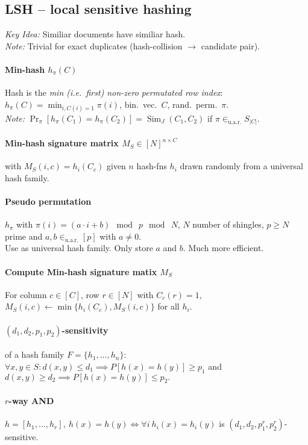\documentclass[9pt]{scrartcl}
\DeclareMathOperator{\Sim}{Sim}
\newcommand{\inuar}{\in_{\text{u.a.r.}}}
\begin{document}
\begin{twocolumn}
\subsection{LSH -- local sensitive hashing}
\emph{Key Idea:} Similiar documents have similiar hash. \\
\emph{Note:} Trivial for exact duplicates (hash-collision $\rightarrow$ candidate pair).
\paragraph{Min-hash $h_\pi(C)$}
Hash is the \emph{min (i.e.\ first) non-zero permutated row index}: $h_\pi(C) = \min_{i, C(i) = 1} \pi(i)$,
bin.\ vec.\ $C$, rand.\ perm.\ $\pi$. \\
\emph{Note:} $\Pr_\pi[h_\pi(C_1) = h_\pi(C_2)] = \Sim_J(C_1,C_2)$ if $\pi \inuar S_{|C|}$.
\paragraph{Min-hash signature matrix $M_S \in [N]^{n\times C}$}
with $M_S(i,c) = h_i(C_c)$
given $n$ hash-fns $h_i$ drawn randomly from a universal hash family.

\paragraph{Pseudo permutation}
$h_\pi$ with $\pi(i) = (a\cdot i + b) \mod\ p \mod\ N$, $N$ number of shingles, $p\geq N$ prime and $a,b \inuar [p]$ with $a \neq 0$. \\
Use as universal hash family. Only store $a$ and $b$. Much more efficient.

\paragraph{Compute Min-hash signature matix $M_S$}
For column $c \in [C]$, row $r \in [N]$ with $C_c(r) = 1$, $M_S(i,c) \leftarrow \min\{h_i(C_c), M_S(i,c)\}$ for all $h_i$.

\paragraph{$(d_1,d_2,p_1,p_2)$-sensitivity} of a hash family $F = \{h_1,\dots,h_n\}$: $\forall x,y \in S: d(x,y) \leq d_1 \implies P[h(x)=h(y)] \geq p_1$ and $d(x,y) \geq d_2 \implies P[h(x)=h(y)] \leq p_2.$
\paragraph{$r$-way AND}
$h = [h_1,\dots,h_r],\ h(x) = h(y) \Leftrightarrow \forall i\ h_i(x) = h_i(y)$ is $(d_1,d_2,p_1^r,p_2^r)$-sensitive.

\end{twocolumn}
\end{document}
